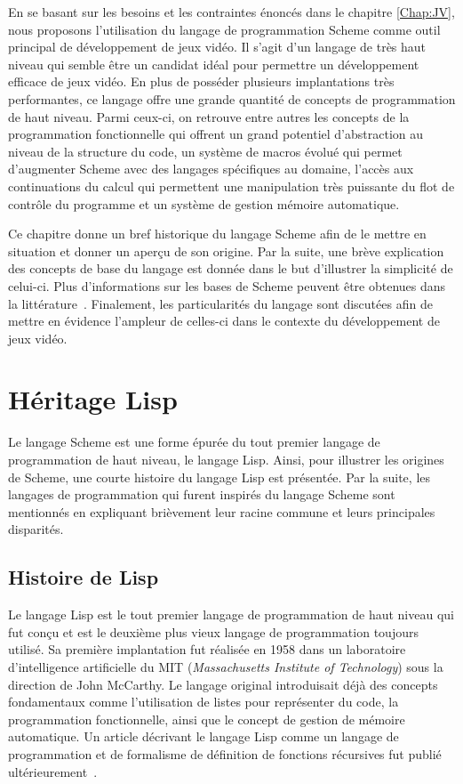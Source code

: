 \documentclass[12pt,twoside,letterpaper,francais]{book}
\begin{document}
En se basant sur les besoins et les contraintes énoncés dans le
chapitre \ref{Chap:JV}, nous proposons l'utilisation du langage de
programmation Scheme comme outil principal de dévelop\-pement de jeux
vidéo. Il s'agit d'un langage de très haut niveau qui semble être un
candidat idéal pour permettre un dévelop\-pement efficace de jeux
vidéo. En plus de posséder plusieurs implantations très performantes,
ce langage offre une grande quantité de concepts de programmation de
haut niveau. Parmi ceux-ci, on retrouve entre autres les concepts de
la programmation fonctionnelle qui offrent un grand potentiel
d'abstraction au niveau de la structure du code, un système de macros
évolué qui permet d'augmenter Scheme avec des langages spécifiques au
domaine, l'accès aux continuations du calcul qui permettent une
manipulation très puissante du flot de contrôle du programme et un
système de gestion mémoire automatique.

Ce chapitre donne un bref historique du langage Scheme afin de le
mettre en situation et donner un aperçu de son origine. Par la suite,
une brève explication des concepts de base du langage est donnée dans
le but d'illustrer la simplicité de celui-ci. Plus d'informations sur
les bases de Scheme peuvent être obtenues dans la
littérature~\cite{R5RS,SICP}. Finalement, les particularités du
langage sont discutées afin de mettre en évidence l'ampleur de
celles-ci dans le contexte du dévelop\-pement de jeux vidéo.


\FloatBarrier
\section{Héritage Lisp} \label{Scheme:hist}
Le langage Scheme est une forme épurée du tout premier langage de
programmation de haut niveau, le langage Lisp. Ainsi, pour illustrer
les origines de Scheme, une courte histoire du langage Lisp est
présentée. Par la suite, les langages de programmation qui furent
inspirés du langage Scheme sont mentionnés en expliquant
brièvement leur racine commune et leurs principales disparités.


\FloatBarrier
\subsection{Histoire de Lisp}
Le langage Lisp est le tout premier langage de programmation de haut
niveau qui fut conçu et est le deuxième plus vieux langage de
programmation toujours utilisé. Sa première implantation fut réalisée
en 1958 dans un laboratoire d'intelligence artificielle du MIT
(\textit{Massachusetts Institute of Technology}) sous la direction de
John McCarthy. Le langage original introduisait déjà des concepts
fondamentaux comme l'utilisation de listes pour représenter du code,
la programmation fonctionnelle, ainsi que le concept de gestion de
mémoire automatique. Un article décrivant le langage Lisp comme un
langage de programmation et de formalisme de définition de fonctions
récursives fut publié ultérieurement~\cite{LISP_ORIGINS}.
\end{document}
